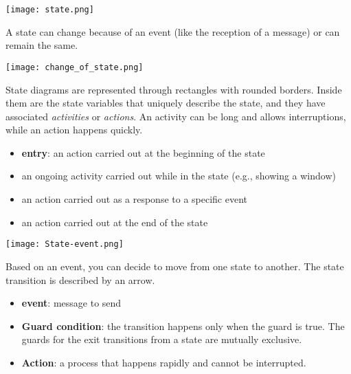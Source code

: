 \begin{center}
    \texttt{[image: state.png]}
\end{center}

A state can change because of an event (like the reception of a message) or can remain the same.

\begin{center}
    \texttt{[image: change\_of\_state.png]}
\end{center}


State diagrams are represented through rectangles with rounded borders.  
Inside them are the state variables that uniquely describe the state, and they have associated \textit{activities} or \textit{actions}.  
An activity can be long and allows interruptions, while an action happens quickly.

\begin{itemize}
    \item \textbf{entry}: an action carried out at the beginning of the state
    \item an ongoing activity carried out while in the state (e.g., showing a window)
    \item an action carried out as a response to a specific event
    \item an action carried out at the end of the state
\end{itemize}

\begin{center}
    \texttt{[image: State-event.png]}
\end{center}

Based on an event, you can decide to move from one state to another.  
The state transition is described by an arrow.

\begin{itemize}
    \item \textbf{event}: message to send
    \item \textbf{Guard condition}: the transition happens only when the guard is true.  
          The guards for the exit transitions from a state are mutually exclusive.
    \item \textbf{Action}: a process that happens rapidly and cannot be interrupted.
\end{itemize}  

